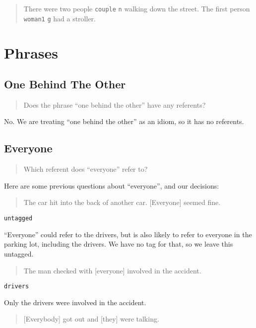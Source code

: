 \documentclass[
]{book}
\begin{document}
\begin{quote}
There were two people \texttt{couple} \texttt{n} walking down the street.
The first person \texttt{woman1} \texttt{g} had a stroller.
\end{quote}

\hypertarget{phrases}{%
\section{Phrases}\label{phrases}}

\hypertarget{one-behind-the-other}{%
\subsection{One Behind The Other}\label{one-behind-the-other}}

\begin{quote}
Does the phrase ``one behind the other'' have any referents?
\end{quote}

No.
We are treating ``one behind the other'' as an idiom, so it has no referents.

\hypertarget{everyone}{%
\subsection{Everyone}\label{everyone}}

\begin{quote}
Which referent does ``everyone'' refer to?
\end{quote}

Here are some previous questions about ``everyone'', and our decisions:

\begin{quote}
The car hit into the back of another car.
{[}Everyone{]} seemed fine.
\end{quote}

\texttt{untagged}

``Everyone'' could refer to the drivers,
but is also likely to refer to everyone in the parking lot,
including the drivers.
We have no tag for that, so we leave this untagged.

\begin{quote}
The man checked with {[}everyone{]} involved in the accident.
\end{quote}

\texttt{drivers}

Only the drivers were involved in the accident.

\begin{quote}
{[}Everybody{]} got out and {[}they{]} were talking.
\end{quote}
\end{document}
